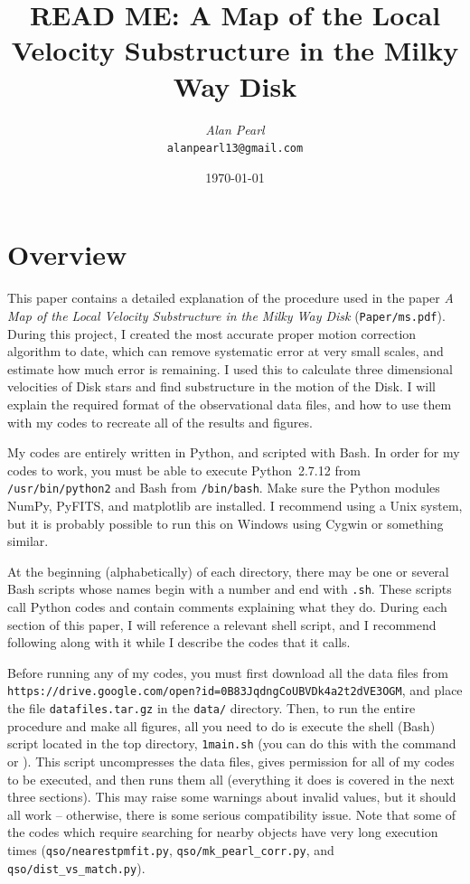 \documentclass{article}
\begin{document}
\title{\textbf{READ ME:} A Map of the Local Velocity Substructure in the Milky Way Disk}
\author{\textit{Alan Pearl}\\
  \texttt{alanpearl13@gmail.com}}
 \date{\today}
\maketitle

\section{Overview}

This paper contains a detailed explanation of the procedure used in the paper \textit{A Map of the Local Velocity Substructure in the Milky Way Disk} (\texttt{Paper/ms.pdf}). During this project, I created the most accurate proper motion correction algorithm to date, which can remove systematic error at very small scales, and estimate how much error is remaining. I used this to calculate three dimensional velocities of Disk stars and find substructure in the motion of the Disk. I will explain the required format of the observational data files, and how to use them with my codes to recreate all of the results and figures. 

My codes are entirely written in Python, and scripted with Bash. In order for my codes to work, you must be able to execute Python~2.7.12 from \texttt{/usr/bin/python2} and Bash from \texttt{/bin/bash}. Make sure the Python modules NumPy, PyFITS, and matplotlib are installed. I recommend using a Unix system, but it is probably possible to run this on Windows using Cygwin or something similar.

At the beginning (alphabetically) of each directory, there may be one or several Bash scripts whose names begin with a number and end with \texttt{.sh}. These scripts call Python codes and contain comments explaining what they do. During each section of this paper, I will reference a relevant shell script, and I recommend following along with it while I describe the codes that it calls.

Before running any of my codes, you must first download all the data files from \texttt{https://drive.google.com/open?id=0B83JqdngCoUBVDk4a2t2dVE3OGM}, and place the file \texttt{datafiles.tar.gz} in the \texttt{data/} directory. Then, to run the entire procedure and make all figures, all you need to do is execute the shell (Bash) script located in the top directory, \texttt{1main.sh} (you can do this with the command  or ). This script uncompresses the data files, gives permission for all of my codes to be executed, and then runs them all (everything it does is covered in the next three sections). This may raise some warnings about invalid values, but it should all work -- otherwise, there is some serious compatibility issue. Note that some of the codes which require searching for nearby objects have very long execution times (\texttt{qso/nearestpmfit.py}, \texttt{qso/mk\_pearl\_corr.py}, and \texttt{qso/dist\_vs\_match.py}).
\end{document}
